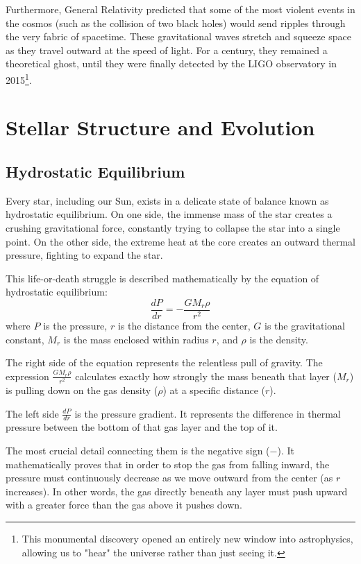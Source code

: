 \documentclass[10pt,a4paper]{article}
\begin{document}
Furthermore, General Relativity predicted that some of the most violent events in the cosmos (such as the collision of two black holes) would send ripples through the very fabric of spacetime. These gravitational waves stretch and squeeze space as they travel outward at the speed of light. For a century, they remained a theoretical ghost, until they were finally detected by the LIGO observatory in 2015\footnote{This monumental discovery opened an entirely new window into astrophysics, allowing us to "hear" the universe rather than just seeing it.}.

\section{Stellar Structure and Evolution}

\subsection{Hydrostatic Equilibrium}
Every star, including our Sun, exists in a delicate state of balance known as hydrostatic equilibrium. On one side, the immense mass of the star creates a crushing gravitational force, constantly trying to collapse the star into a single point. On the other side, the extreme heat at the core creates an outward thermal pressure, fighting to expand the star.

This life-or-death struggle is described mathematically by the equation of hydrostatic equilibrium:
$$\frac{dP}{dr} = - \frac{G M_r \rho}{r^2}$$
where $P$ is the pressure, $r$ is the distance from the center, $G$ is the gravitational constant, $M_r$ is the mass enclosed within radius $r$, and $\rho$ is the density. 


The right side of the equation represents the relentless pull of gravity. The expression $\frac{G M_r \rho}{r^2}$ calculates exactly how strongly the mass beneath that layer ($M_r$) is pulling down on the gas density ($\rho$) at a specific distance ($r$).

The left side $\frac{dP}{dr}$ is the pressure gradient. It represents the difference in thermal pressure between the bottom of that gas layer and the top of it. 

The most crucial detail connecting them is the negative sign ($-$). It mathematically proves that in order to stop the gas from falling inward, the pressure must continuously decrease as we move outward from the center (as $r$ increases). In other words, the gas directly beneath any layer must push upward with a greater force than the gas above it pushes down.
\end{document}
